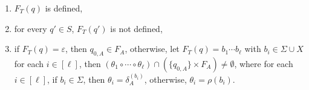 \begin{itemize}
                            \begin{enumerate}
                                \item $F_T (q)$ is defined,
                                \item for every $q' \in S$, $F_T (q')$ is not defined,
                                \item if $F_T(q) = \varepsilon$, then $q_{0, A}  \in F_A$, otherwise,
                                    let $F_T(q) = b_1 \cdots b_\ell$ with $b_i \in \Sigma \cup X$ for each $i \in [\ell]$, then $(\theta_1 \circ \cdots \circ \theta_\ell) \cap (\{q_{0,A}\} \times F_A) \neq \emptyset$, where for each $i \in [\ell]$, if $b_i \in \Sigma$, then $\theta_i = \delta^{(b_i)}_A$, otherwise, $\theta_i = \rho(b_i)$.
                            \end{enumerate}
                    \end{itemize}

